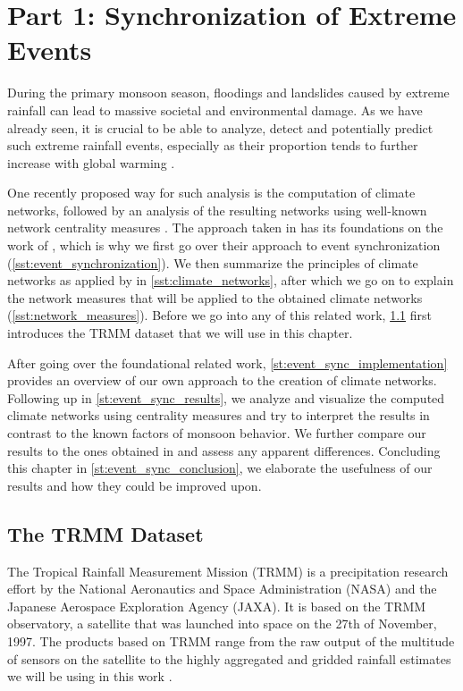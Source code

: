 \chapter{Part 1: Synchronization of Extreme Events}
\label{c:event_sync}
During the primary monsoon season, floodings and landslides caused by extreme rainfall can lead to massive societal and environmental damage. As we have already seen, it is crucial to be able to analyze, detect and potentially predict such extreme rainfall events, especially as their proportion tends to further increase with global warming \citep{Stolbova.2015}.

One recently proposed way for such analysis is the computation of climate networks, followed by an analysis of the resulting networks using well-known network centrality measures \citep{Stolbova.2015}. The approach taken in \citet{Stolbova.2015} has its foundations on the work of \citet{QuianQuiroga.2002}, which is why we first go over their approach to event synchronization (\cref{sst:event_synchronization}). We then summarize the principles of climate networks as applied by \citet{Stolbova.2015} in \cref{sst:climate_networks}, after which we go on to explain the network measures that will be applied to the obtained climate networks (\cref{sst:network_measures}). Before we go into any of this related work, \cref{st:trmm_dataset} first introduces the TRMM dataset that we will use in this chapter.

After going over the foundational related work, \cref{st:event_sync_implementation} provides an overview of our own approach to the creation of climate networks. Following up in \cref{st:event_sync_results}, we analyze and visualize the computed climate networks using centrality measures and try to interpret the results in contrast to the known factors of monsoon behavior. We further compare our results to the ones obtained in \citet{Stolbova.2015} and assess any apparent differences. Concluding this chapter in \cref{st:event_sync_conclusion}, we elaborate the usefulness of our results and how they could be improved upon.


\section{The TRMM Dataset}
\label{st:trmm_dataset}
The Tropical Rainfall Measurement Mission (TRMM) is a precipitation research effort by the National Aeronautics and Space Administration (NASA) and the Japanese Aerospace Exploration Agency (JAXA). It is based on the TRMM observatory, a satellite that was launched into space on the 27th of November, 1997. The products based on TRMM range from the raw output of the multitude of sensors on the satellite to the highly aggregated and gridded rainfall estimates we will be using in this work \citep{GoddardEarthScienceDataInformationandServicesCenter.2016}.

